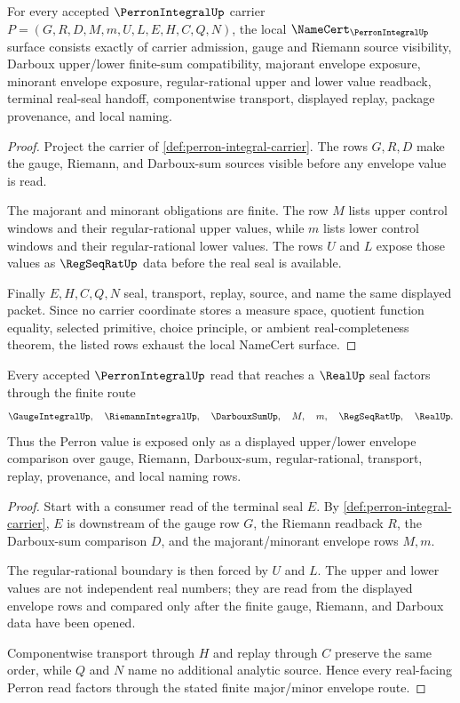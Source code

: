 \begin{theorem}
\label{thm:perron-integral-namecert-obligations}
For every accepted $\PerronIntegralUp$ carrier $P=(G,R,D,M,m,U,L,E,H,C,Q,N)$, the local $\NameCert_{\PerronIntegralUp}$ surface consists exactly of carrier admission, gauge and Riemann source visibility, Darboux upper/lower finite-sum compatibility, majorant envelope exposure, minorant envelope exposure, regular-rational upper and lower value readback, terminal real-seal handoff, componentwise transport, displayed replay, package provenance, and local naming.
\end{theorem}
\begin{proof}
Project the carrier of \autoref{def:perron-integral-carrier}. The rows $G,R,D$ make the gauge, Riemann, and Darboux-sum sources visible before any envelope value is read.

The majorant and minorant obligations are finite. The row $M$ lists upper control windows and their regular-rational upper values, while $m$ lists lower control windows and their regular-rational lower values. The rows $U$ and $L$ expose those values as $\RegSeqRatUp$ data before the real seal is available.

Finally $E,H,C,Q,N$ seal, transport, replay, source, and name the same displayed packet. Since no carrier coordinate stores a measure space, quotient function equality, selected primitive, choice principle, or ambient real-completeness theorem, the listed rows exhaust the local NameCert surface.
\end{proof}

\begin{theorem}
\label{thm:perron-integral-major-minor-route}
Every accepted $\PerronIntegralUp$ read that reaches a $\RealUp$ seal factors through the finite route
$$
\GaugeIntegralUp,\quad
\RiemannIntegralUp,\quad
\DarbouxSumUp,\quad
M,\quad
m,\quad
\RegSeqRatUp,\quad
\RealUp .
$$
Thus the Perron value is exposed only as a displayed upper/lower envelope comparison over gauge, Riemann, Darboux-sum, regular-rational, transport, replay, provenance, and local naming rows.
\end{theorem}
\begin{proof}
Start with a consumer read of the terminal seal $E$. By \autoref{def:perron-integral-carrier}, $E$ is downstream of the gauge row $G$, the Riemann readback $R$, the Darboux-sum comparison $D$, and the majorant/minorant envelope rows $M,m$.

The regular-rational boundary is then forced by $U$ and $L$. The upper and lower values are not independent real numbers; they are read from the displayed envelope rows and compared only after the finite gauge, Riemann, and Darboux data have been opened.

Componentwise transport through $H$ and replay through $C$ preserve the same order, while $Q$ and $N$ name no additional analytic source. Hence every real-facing Perron read factors through the stated finite major/minor envelope route.
\end{proof}

